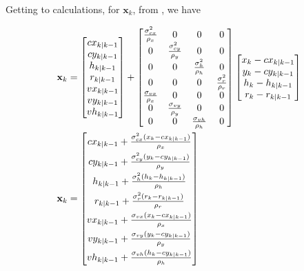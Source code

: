 \documentclass[10pt]{article}
\begin{document}
    \noindent Getting to calculations, for \(\mathbf{x}_k\), from , we have

    \begin{align}
        \mathbf{x}_k &= \begin{bmatrix}
            cx_{k|k-1} \\
            cy_{k|k-1} \\
            h_{k|k-1} \\
            r_{k|k-1} \\
            vx_{k|k-1} \\
            vy_{k|k-1} \\
            vh_{k|k-1}
        \end{bmatrix} +
        \begin{bmatrix}
            \frac{\sigma^2_{cx}}{\rho_x} & 0 & 0 & 0 \\
            0 & \frac{\sigma^2_{cy}}{\rho_y} & 0 & 0 \\
            0 & 0 & \frac{\sigma^2_h}{\rho_h} & 0 \\
            0 & 0 & 0 & \frac{\sigma^2_r}{\rho_r} \\
            \frac{\sigma_{vx}}{\rho_x} & 0 & 0 & 0 \\
            0 & \frac{\sigma_{vy}}{\rho_y} & 0 & 0 \\
            0 & 0 & \frac{\sigma_{vh}}{\rho_h} & 0
        \end{bmatrix}
        \begin{bmatrix}
            x_k - cx_{k|k-1} \\
            y_k - cy_{k|k-1} \\
            h_k - h_{k|k-1} \\
            r_k - r_{k|k-1}
        \end{bmatrix} \notag \\
        \mathbf{x}_k &= \begin{bmatrix}
            cx_{k|k-1} + \frac{\sigma^2_{cx}(x_k - cx_{k|k-1})}{\rho_x} \\[5pt]
            cy_{k|k-1} + \frac{\sigma^2_{cy}(y_k - cy_{k|k-1})}{\rho_y} \\[5pt]
            h_{k|k-1} + \frac{\sigma^2_h(h_k - h_{k|k-1})}{\rho_h} \\[5pt]
            r_{k|k-1} + \frac{\sigma^2_r(r_k - r_{k|k-1})}{\rho_r} \\[5pt]
            vx_{k|k-1} + \frac{\sigma_{vx}(x_k - cx_{k|k-1})}{\rho_x} \\[5pt]
            vy_{k|k-1} + \frac{\sigma_{vy}(y_k - cy_{k|k-1})}{\rho_y} \\[5pt]
            vh_{k|k-1} + \frac{\sigma_{vh}(h_k - cy_{k|k-1})}{\rho_h}
        \end{bmatrix}
        \label{Eq:X_update}
    \end{align}
    
\end{document}

